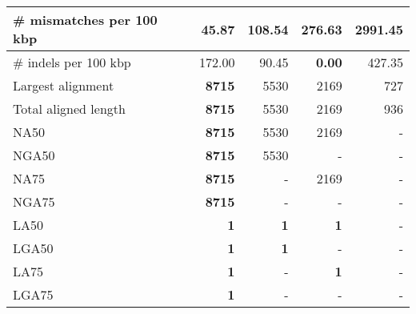 \documentclass[12pt,a4paper]{article}
\begin{document}
\begin{table}[ht]
\begin{center}
\begin{tabular}{|l*{4}{|r}|}
\# mismatches per 100 kbp & {\bf 45.87} & 108.54 & 276.63 & 2991.45 \\ \hline
\# indels per 100 kbp & 172.00 & 90.45 & {\bf 0.00} & 427.35 \\ \hline
Largest alignment & {\bf 8715} & 5530 & 2169 & 727 \\ \hline
Total aligned length & {\bf 8715} & 5530 & 2169 & 936 \\ \hline
NA50 & {\bf 8715} & 5530 & 2169 & - \\ \hline
NGA50 & {\bf 8715} & 5530 & - & - \\ \hline
NA75 & {\bf 8715} & - & 2169 & - \\ \hline
NGA75 & {\bf 8715} & - & - & - \\ \hline
LA50 & {\bf 1} & {\bf 1} & {\bf 1} & - \\ \hline
LGA50 & {\bf 1} & {\bf 1} & - & - \\ \hline
LA75 & {\bf 1} & - & {\bf 1} & - \\ \hline
LGA75 & {\bf 1} & - & - & - \\ \hline
\end{tabular}
\end{center}
\end{table}
\end{document}
